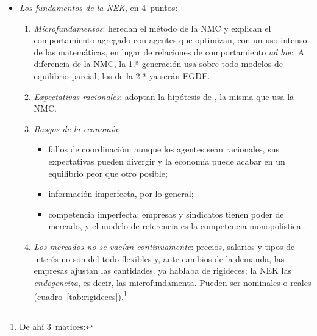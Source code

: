 \documentclass[11pt]{article}
\begin{document}
\begin{itemize}
\begin{itemize}
\begin{itemize}
\begin{itemize}
\begin{enumerate}
        \end{enumerate}
      \item Aceptan el esqueleto de la síntesis: la demanda agregada mueve la producción a corto plazo y la política monetaria y la fiscal son eficaces. Le dan lo que le faltaba, una oferta con fundamentos, en la que optimizan las empresas que fijan precios y los trabajadores que negocian salarios.
      \item Son eclécticos: conviven modelos complementarios, y cada uno privilegia un determinante de la rigidez.
      \item Comparten un enfoque de \emph{equilibrio parcial} con alguna imperfección, en modelos sobre todo \emph{estáticos} (salvo el de equilibrio general de \textcite{BlanchardKiyotaki1987Monopolistic}).
      \end{itemize}
    \item \emph{Los fundamentos de la NEK}, en 4~puntos:
      \begin{enumerate}
      \item \emph{Microfundamentos}: heredan el método de la NMC y explican el comportamiento agregado con agentes que optimizan, con un uso intenso de las matemáticas, en lugar de relaciones de comportamiento \emph{ad hoc}. A diferencia de la NMC, la 1.ª generación usa sobre todo modelos de equilibrio parcial; los de la 2.ª ya serán EGDE.
      \item \emph{Expectativas racionales}: adoptan la hipótesis de \textcite{Muth1961Rational}, la misma que usa la NMC.
      \item \emph{Rasgos de la economía}:
        \begin{itemize}
        \item fallos de coordinación: aunque los agentes sean racionales, sus expectativas pueden divergir y la economía puede acabar en un equilibrio peor que otro posible;
        \item información imperfecta, por lo general;
        \item competencia imperfecta: empresas y sindicatos tienen poder de mercado, y el modelo de referencia es la competencia monopolística .
        \end{itemize}
      \item \emph{Los mercados no se vacían continuamente}: precios, salarios y tipos de interés no son del todo flexibles y, ante cambios de la demanda, las empresas ajustan las cantidades.  ya hablaba de rigideces; la NEK las \emph{endogeneiza}, es decir, las microfundamenta. Pueden ser nominales o reales (cuadro~\ref{tab:rigideces}).\footnote{De ahí 3~matices:
}
\end{enumerate}
\end{itemize}
\end{itemize}
\end{itemize}
\end{document}
